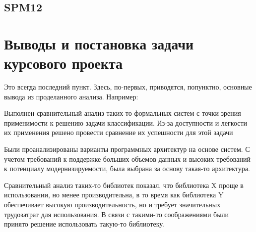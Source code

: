 \subsection{SPM12}


\section{Выводы и постановка задачи курсового проекта}

Это всегда последний пункт. Здесь, по-первых, приводятся, попунктно, основные вывода из проделанного анализа. Например:

\begin{compactenum}
	\item Выполнен сравнительный анализ таких-то формальных систем с точки зрения применимости к решению  задачи классификации. Из-за доступности и легкости их применения решено провести сравнение их успешности для этой задачи
	\item Были проанализированы варианты программных архитектур на основе систем. С учетом требований к поддержке больших объемов данных и высоких требований к потенциалу модернизируемости, была выбрана за основу такая-то архитектура.
	\item Сравнительный анализ таких-то библиотек показал, что библиотека X проще в использовании, но менее производительна, в то время как библиотека Y обеспечивает высокую производительность, но и требует значительных трудозатрат для использования. В связи с такими-то соображениями были принято решение использовать такую-то библиотеку.
\end{compactenum}

